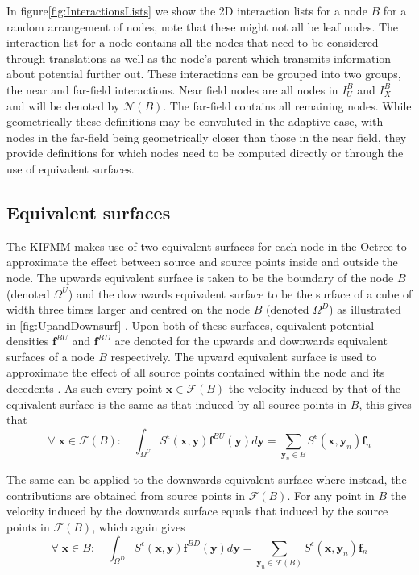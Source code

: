 In figure\ref{fig:InteractionsLists} we show the 2D interaction lists for a node $B$ for a random arrangement of nodes, note that these might not all be leaf nodes. The interaction list for a node contains all the nodes that need to be considered through translations as well as the node's parent which transmits information about potential further out. These interactions can be grouped into two groups, the near and far-field interactions. Near field nodes are all nodes in $I_U^B$ and $I_X^B$ and will be denoted by $\mathcal{N}(B)$. The far-field contains all remaining nodes. While geometrically these definitions may be convoluted in the adaptive case, with nodes in the far-field being geometrically closer than those in the near field, they provide definitions for which nodes need to be computed directly or through the use of equivalent surfaces.

\subsection{Equivalent surfaces}

The KIFMM makes use of two equivalent surfaces for each node in the Octree to approximate the effect between source and source points inside and outside the node. The upwards equivalent surface is taken to be the boundary of the node $B$ (denoted $\Omega^U$) and the downwards equivalent surface to be the surface of a cube of width three times larger and centred on the node $B$ (denoted $\Omega^D$) as illustrated in \cref{fig:UpandDownsurf} \cite{Ying2004}. Upon both of these surfaces, equivalent potential densities $\bm{f}^{BU}$ and $\bm{f}^{BD}$ are denoted for the upwards and downwards equivalent surfaces of a node $B$ respectively. The upward equivalent surface is used to approximate the effect of all source points contained within the node and its decedents \cite{Rostami2016Kernel-independentStokeslets,Yan}. As such every point $\bm{x}\in\mathcal{F}(B)$ the velocity induced by that of the equivalent surface is the same as that induced by all source points in $B$, this gives that
\begin{equation}
\label{eq:upsurfint}
    \forall \;\bm{x} \in \mathcal{F}(B): \quad \int_{\Omega^U} S^\epsilon(\bm{x}, \bm{y}) \bm{f}^{BU}(\bm{y}) d \bm{y}=\sum_{{\bm{y}}_n \in B} S^\epsilon\left(\bm{x}, {\bm{y}}_n\right) {\bm{f}}_{n}
\end{equation}

The same can be applied to the downwards equivalent surface where instead, the contributions are obtained from source points in $\mathcal{F}(B)$. For any point in $B$ the velocity induced by the downwards surface equals that induced by the source points in $\mathcal{F}(B)$, which again gives
\begin{equation}
\label{eq:downsurfint}
    \forall \;\bm{x} \in B: \quad \int_{\Omega^D} S^\epsilon(\bm{x}, \bm{y}) \bm{f}^{BD}(\bm{y}) d \bm{y}=\sum_{{\bm{y}}_n \in \mathcal{F}(B)} S^\epsilon\left(\bm{x}, {\bm{y}}_n\right) {\bm{f}}_{n}
\end{equation}

